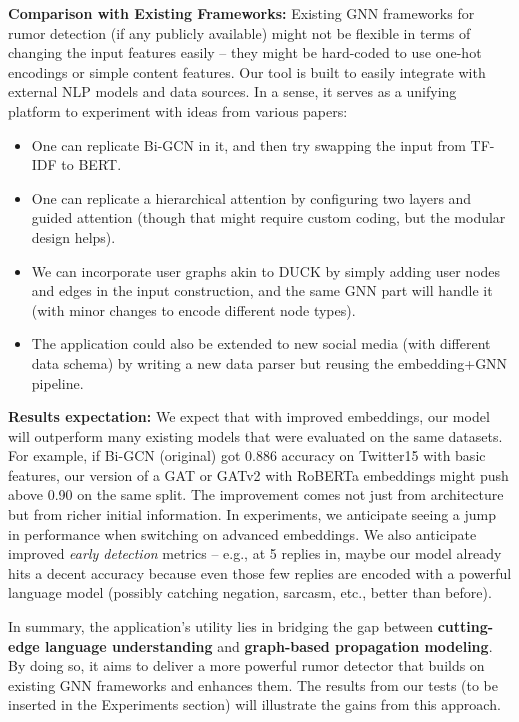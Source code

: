\documentclass[12pt,a4paper]{report}
\begin{document}
\textbf{Comparison with Existing Frameworks:} Existing GNN frameworks for rumor detection (if any publicly available) might not be flexible in terms of changing the input features easily – they might be hard-coded to use one-hot encodings or simple content features. Our tool is built to easily integrate with external NLP models and data sources. In a sense, it serves as a unifying platform to experiment with ideas from various papers:
\begin{itemize}[leftmargin=1.2cm]
    \item One can replicate Bi-GCN in it, and then try swapping the input from TF-IDF to BERT.
    \item One can replicate a hierarchical attention by configuring two layers and guided attention (though that might require custom coding, but the modular design helps).
    \item We can incorporate user graphs akin to DUCK by simply adding user nodes and edges in the input construction, and the same GNN part will handle it (with minor changes to encode different node types).
    \item The application could also be extended to new social media (with different data schema) by writing a new data parser but reusing the embedding+GNN pipeline.
\end{itemize}

\textbf{Results expectation:} We expect that with improved embeddings, our model will outperform many existing models that were evaluated on the same datasets. For example, if Bi-GCN (original) got 0.886 accuracy on Twitter15 with basic features, our version of a GAT or GATv2 with RoBERTa embeddings might push above 0.90 on the same split. The improvement comes not just from architecture but from richer initial information. In experiments, we anticipate seeing a jump in performance when switching on advanced embeddings. We also anticipate improved \textit{early detection} metrics – e.g., at 5 replies in, maybe our model already hits a decent accuracy because even those few replies are encoded with a powerful language model (possibly catching negation, sarcasm, etc., better than before).

In summary, the application’s utility lies in bridging the gap between \textbf{cutting-edge language understanding} and \textbf{graph-based propagation modeling}. By doing so, it aims to deliver a more powerful rumor detector that builds on existing GNN frameworks and enhances them. The results from our tests (to be inserted in the Experiments section) will illustrate the gains from this approach.
\end{document}
